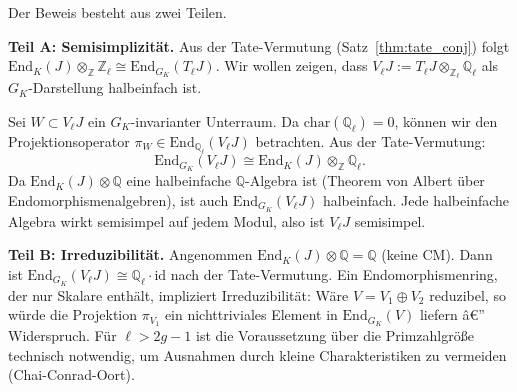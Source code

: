 ﻿\documentclass[12pt,a4paper]{article}
\theoremstyle{plain}
\theoremstyle{definition}
\theoremstyle{remark}
\newenvironment{proof*}[1][Beweis]{%
  \begin{proof}[#1]\renewcommand{\qedsymbol}{$\blacksquare$}}
  {\end{proof}}
\newcommand{\Q}{\mathbb{Q}}
\newcommand{\Z}{\mathbb{Z}}
\newcommand{\End}{\mathrm{End}}
\begin{document}
\begin{proof*}
Der Beweis besteht aus zwei Teilen.

\textbf{Teil A: Semisimplizität.}
Aus der Tate-Vermutung (Satz~\ref{thm:tate_conj}) folgt
$\End_K(J) \otimes_\Z \Z_\ell \cong \End_{G_K}(T_\ell J)$.
Wir wollen zeigen, dass $V_\ell J := T_\ell J \otimes_{\Z_\ell} \Q_\ell$
als $G_K$-Darstellung halbeinfach ist.

Sei $W \subset V_\ell J$ ein $G_K$-invarianter Unterraum.
Da $\mathrm{char}(\Q_\ell) = 0$, können wir den Projektionsoperator
$\pi_W \in \End_{\Q_\ell}(V_\ell J)$ betrachten. Aus der Tate-Vermutung:
\[
  \End_{G_K}(V_\ell J) \cong \End_K(J) \otimes_\Z \Q_\ell.
\]
Da $\End_K(J) \otimes \Q$ eine halbeinfache $\Q$-Algebra ist
(Theorem von Albert über Endomorphismenalgebren), ist auch
$\End_{G_K}(V_\ell J)$ halbeinfach. Jede halbeinfache Algebra wirkt
semisimpel auf jedem Modul, also ist $V_\ell J$ semisimpel.

\textbf{Teil B: Irreduzibilität.}
Angenommen $\End_K(J)\otimes\Q = \Q$ (keine CM). Dann ist
$\End_{G_K}(V_\ell J) \cong \Q_\ell \cdot \mathrm{id}$ nach der Tate-Vermutung.
Ein Endomorphismenring, der nur Skalare enthält, impliziert Irreduzibilität:
Wäre $V = V_1 \oplus V_2$ reduzibel, so würde die Projektion $\pi_{V_1}$
ein nichttriviales Element in $\End_{G_K}(V)$ liefern â€” Widerspruch.
Für $\ell > 2g-1$ ist die Voraussetzung über die Primzahlgröße technisch notwendig,
um Ausnahmen durch kleine Charakteristiken zu vermeiden (Chai-Conrad-Oort).
\end{proof*}
\end{document}
